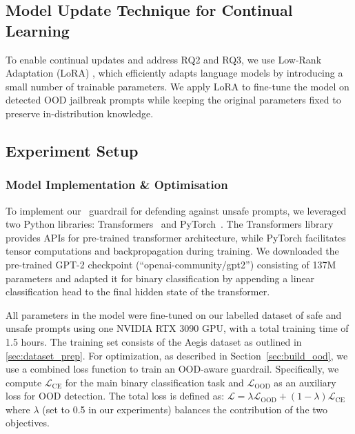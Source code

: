 
\subsection{Model Update Technique for Continual Learning}
To enable continual updates and address RQ2 and RQ3, we use Low-Rank Adaptation (LoRA) \cite{hu2022lora}, which efficiently adapts language models by introducing a small number of trainable parameters. We apply LoRA to fine-tune the model on detected OOD jailbreak prompts while keeping the original parameters fixed to preserve in-distribution knowledge.

\subsection{Experiment Setup}
\label{sec:experiment_setup}
\subsubsection{Model Implementation \& Optimisation}
\label{sec:model_impl}
To implement our \ourapp~guardrail for defending against unsafe prompts, we leveraged two Python libraries: Transformers~\cite{wolf2019huggingface} and PyTorch~\cite{paszke2017automatic}. The Transformers library provides APIs for pre-trained transformer architecture, while PyTorch facilitates tensor computations and backpropagation during training.
We downloaded the pre-trained GPT-2 checkpoint (``openai-community/gpt2'') consisting of 137M parameters and adapted it for binary classification by appending a linear classification head to the final hidden state of the transformer.

All parameters in the model were fine-tuned on our labelled dataset of safe and unsafe prompts using one NVIDIA RTX 3090 GPU, with a total training time of 1.5 hours. The training set consists of the Aegis dataset as outlined in \ref{sec:dataset_prep}.
For optimization, as described in Section~\ref{sec:build_ood}, we use a combined loss function to train an OOD-aware guardrail. Specifically, we compute $\mathcal{L}_{\text{CE}}$ for the main binary classification task and $\mathcal{L}_{\text{OOD}}$ as an auxiliary loss for OOD detection. The total loss is defined as:
$\mathcal{L} = \lambda \mathcal{L}_{\text{OOD}} + (1 - \lambda) \mathcal{L}_{\text{CE}}$
where $\lambda$ (set to 0.5 in our experiments) balances the contribution of the two objectives.

